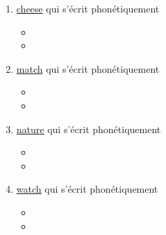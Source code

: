 \begin{enumerate}
\item \href{http://www.wordreference.com/enfr/cheese}{cheese} qui
  s'écrit phonétiquement
  \href{https://en.oxforddictionaries.com/definition/cheese}{}
  
  \begin{itemize}
  \item{}
  \item{}
  \end{itemize}

  
\item \href{http://www.wordreference.com/enfr/match}{match} qui
  s'écrit phonétiquement
  \href{https://en.oxforddictionaries.com/definition/match}{}
  
  \begin{itemize}
  \item{}
  \item{}
  \end{itemize}

  
\item \href{http://www.wordreference.com/enfr/nature}{nature} qui
  s'écrit phonétiquement
  \href{https://en.oxforddictionaries.com/definition/nature}{}
  
  \begin{itemize}
  \item{}
  \item{}
  \end{itemize}

  
\item \href{http://www.wordreference.com/enfr/watch}{watch} qui
  s'écrit phonétiquement
  \href{https://en.oxforddictionaries.com/definition/watch}{}
  
  \begin{itemize}
  \item{}
  \item{}
  \end{itemize}

  
\end{enumerate}


